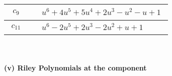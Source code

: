 \documentclass[1p]{elsarticle_modified}
\theoremstyle{definition}
\begin{document}
\begin{tabular}{m{50pt}|m{274pt}}
\hline $$\begin{aligned}c_{9}\end{aligned}$$&$\begin{aligned}
&u^6+4 u^5+5 u^4+2 u^3- u^2- u+1
\end{aligned}$\\
\hline $$\begin{aligned}c_{11}\end{aligned}$$&$\begin{aligned}
&u^6-2 u^5+2 u^3-2 u^2+u+1
\end{aligned}$\\
\hline
\end{tabular}\\~\\
\newpage\renewcommand{\arraystretch}{1}
\flushleft \textbf{(v) Riley Polynomials at the component}\newline \\
\end{document}
